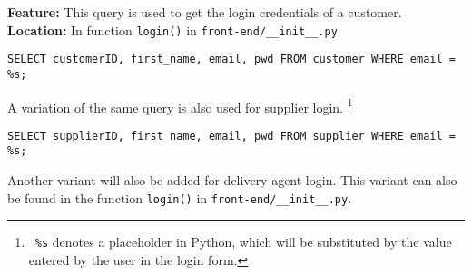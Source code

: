 \textbf{Feature:} This query is used to get the login credentials of a customer. \\
\textbf{Location:} In function \texttt{login()} in \texttt{front-end/\_\_init\_\_.py}

\begin{lstlisting}
SELECT customerID, first_name, email, pwd FROM customer WHERE email = %s;
\end{lstlisting}

A variation of the same query is also used for supplier login.
\footnote{
    \ \texttt{\%s} denotes a placeholder in Python, which will be substituted by the value entered by the user in the login form.
}

\begin{lstlisting}
SELECT supplierID, first_name, email, pwd FROM supplier WHERE email = %s;
\end{lstlisting}

Another variant will also be added for delivery agent login.
This variant can also be found in the function \texttt{login()} in \texttt{front-end/\_\_init\_\_.py}. \\